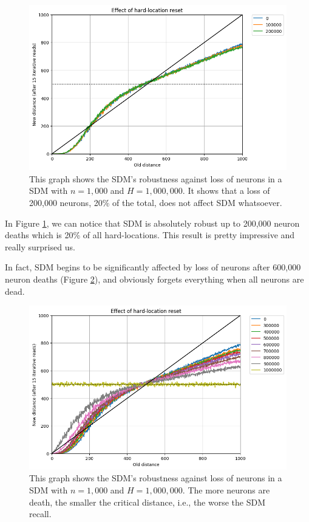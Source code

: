 \begin{figure}[!p]
\centering\includegraphics[width=\textwidth]{./images02/new-images/sdm-neuron-death-200k.png}
\caption{This graph shows the SDM's robustness against loss of neurons in a SDM with $n=1,000$ and $H=1,000,000$. It shows that a loss of 200,000 neurons, 20\% of the total, does not affect SDM whatsoever.
\label{fig:sdm-neuron-death-200k}}
\end{figure}

In Figure \ref{fig:sdm-neuron-death-200k}, we can notice that SDM is absolutely robust up to 200,000 neuron deaths which is 20\% of all hard-locations. This result is pretty impressive and really surprised us.

In fact, SDM begins to be significantly affected by loss of neurons after 600,000 neuron deaths (Figure \ref{fig:sdm-neuron-death-1m}), and obviously forgets everything when all neurons are dead.

\begin{figure}[!p]
\centering\includegraphics[width=\textwidth]{./images02/new-images/sdm-neuron-death-1m.png}
\caption{This graph shows the SDM's robustness against loss of neurons in a SDM with $n=1,000$ and $H=1,000,000$. The more neurons are death, the smaller the critical distance, i.e., the worse the SDM recall.
\label{fig:sdm-neuron-death-1m}}
\end{figure}

